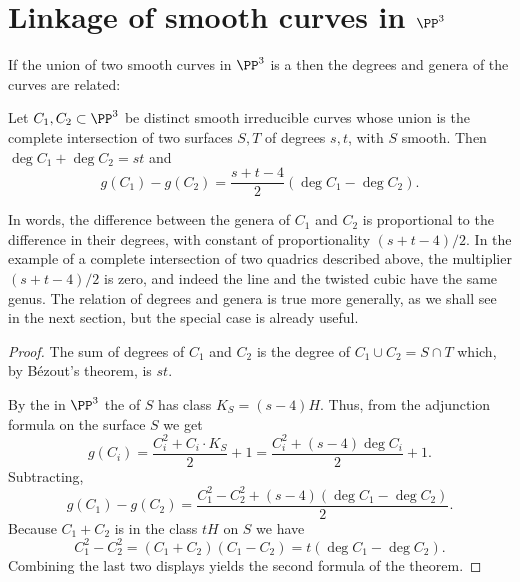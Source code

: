 \section{Linkage of smooth curves in $\PP^3$}
\label{SLinkage}\label{linkage section}

If the union of two smooth curves in $\PP^3$ is a 
%
then the degrees and genera
of the curves are related:

\begin{theorem}\label{liaison genus formula-first version}
Let $C_1, C_2\subset \PP^3$ be distinct smooth irreducible curves
whose union is the complete
intersection
of two surfaces $S,T$
of degrees $s,t$,
with $S$ smooth.
Then $ \deg C_1+\deg C_2 = st$ and
$$
g(C_1) - g(C_2) = \frac{s+t-4}{2}(\deg C_1-\deg C_2).
$$
\end{theorem}

In words, the difference between the genera of $C_1$ and $C_2$
is proportional to the difference in their degrees, with constant of
proportionality $(s+t-4)/2$.
In the
example of a
complete
intersection of two quadrics
described above, the multiplier $(s+t-4)/2$
is zero,
and indeed the line
and the twisted cubic have the same genus.
The relation of degrees and genera is true more generally, as we shall
see in the next section, but the special
case is already useful.

\begin{proof}
The sum of degrees of $C_1$ and $C_2$ is the degree of $ C_1\cup C_2=S\cap T $ 
which,  by B\'ezout's theorem, is $st$.

By the
%
in $\PP^3$ the
of $S$ has
%
%
class $K_S = (s-4)H$. Thus, from the
adjunction formula on the surface $S$ we get
$$
g(C_i) = \frac{C_i^2+C_i\cdot K_S}{2}+1 = \frac{C_i^2+(s-4) \deg
C_i}{2}+1.
$$
Subtracting,
$$
g(C_1)-g(C_2) = \frac{C_1^2-C_2^2+(s-4) (\deg C_1-\deg C_2)} {2}.
$$
Because $C_1+C_2$ is in the class $tH$ on $S$ we have
$$
C_1^2-C_2^2 = (C_1+C_2)(C_1-C_2) = t(\deg C_1-\deg C_2).
$$
Combining the last two displays yields
the second formula
of the theorem.
\end{proof}


